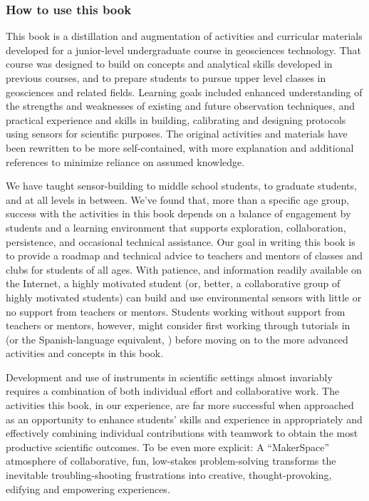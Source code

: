 \subsubsection{How to use this book}
This book is a distillation and augmentation of activities and curricular materials developed for a junior-level undergraduate course in geosciences technology.
That course was designed to build on concepts and analytical skills developed in previous courses, and to prepare students to pursue upper level classes in geosciences and related fields.
Learning goals included enhanced understanding of the strengths and weaknesses of existing and future observation techniques, and practical experience and skills in building, calibrating and designing protocols using sensors for scientific purposes. 
The original activities and materials have been rewritten to be more self-contained, with more explanation and additional references to minimize reliance on assumed knowledge.

We have taught sensor-building to middle school students, to graduate students, and at all levels in between. 
We've found that, more than a specific age group, success with the activities in this book depends on a balance of engagement by students and a learning environment that supports exploration, collaboration, persistence, and occasional technical assistance.
Our goal in writing this book is to provide a roadmap and technical advice to teachers and mentors of classes and clubs for students of all ages.
With patience, and information readily available on the Internet, a highly motivated student (or, better, a collaborative group of highly motivated students) can build and use environmental sensors with little or no support from teachers or mentors.
Students working without support from teachers or mentors, however, might consider first working through tutorials in  (or the Spanish-language equivalent, ) before moving on to the more advanced activities and concepts in this book.

Development and use of instruments in scientific settings almost invariably requires a combination of both individual effort and collaborative work. 
The activities this book, in our experience, are far more successful when approached as an opportunity to enhance students' skills and experience in appropriately and effectively combining individual contributions with teamwork to obtain the most productive scientific outcomes. 
To be even more explicit: 
A ``MakerSpace'' atmosphere of collaborative, fun, low-stakes problem-solving transforms the inevitable troubling-shooting frustrations into creative, thought-provoking, edifying and empowering experiences.

